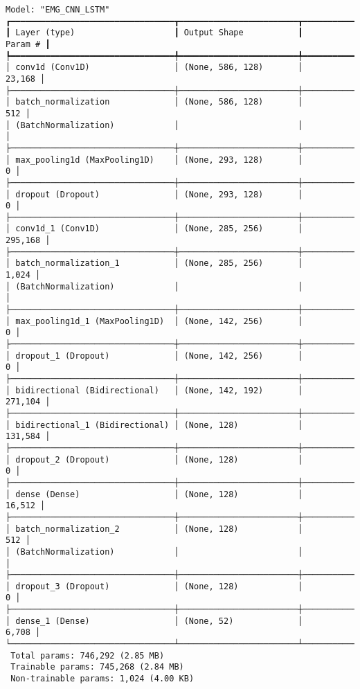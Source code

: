 \begin{verbatim}
Model: "EMG_CNN_LSTM"
┏━━━━━━━━━━━━━━━━━━━━━━━━━━━━━━━━━┳━━━━━━━━━━━━━━━━━━━━━━━━┳━━━━━━━━━━━━━━━┓
┃ Layer (type)                    ┃ Output Shape           ┃       Param # ┃
┡━━━━━━━━━━━━━━━━━━━━━━━━━━━━━━━━━╇━━━━━━━━━━━━━━━━━━━━━━━━╇━━━━━━━━━━━━━━━┩
│ conv1d (Conv1D)                 │ (None, 586, 128)       │        23,168 │
├─────────────────────────────────┼────────────────────────┼───────────────┤
│ batch_normalization             │ (None, 586, 128)       │           512 │
│ (BatchNormalization)            │                        │               │
├─────────────────────────────────┼────────────────────────┼───────────────┤
│ max_pooling1d (MaxPooling1D)    │ (None, 293, 128)       │             0 │
├─────────────────────────────────┼────────────────────────┼───────────────┤
│ dropout (Dropout)               │ (None, 293, 128)       │             0 │
├─────────────────────────────────┼────────────────────────┼───────────────┤
│ conv1d_1 (Conv1D)               │ (None, 285, 256)       │       295,168 │
├─────────────────────────────────┼────────────────────────┼───────────────┤
│ batch_normalization_1           │ (None, 285, 256)       │         1,024 │
│ (BatchNormalization)            │                        │               │
├─────────────────────────────────┼────────────────────────┼───────────────┤
│ max_pooling1d_1 (MaxPooling1D)  │ (None, 142, 256)       │             0 │
├─────────────────────────────────┼────────────────────────┼───────────────┤
│ dropout_1 (Dropout)             │ (None, 142, 256)       │             0 │
├─────────────────────────────────┼────────────────────────┼───────────────┤
│ bidirectional (Bidirectional)   │ (None, 142, 192)       │       271,104 │
├─────────────────────────────────┼────────────────────────┼───────────────┤
│ bidirectional_1 (Bidirectional) │ (None, 128)            │       131,584 │
├─────────────────────────────────┼────────────────────────┼───────────────┤
│ dropout_2 (Dropout)             │ (None, 128)            │             0 │
├─────────────────────────────────┼────────────────────────┼───────────────┤
│ dense (Dense)                   │ (None, 128)            │        16,512 │
├─────────────────────────────────┼────────────────────────┼───────────────┤
│ batch_normalization_2           │ (None, 128)            │           512 │
│ (BatchNormalization)            │                        │               │
├─────────────────────────────────┼────────────────────────┼───────────────┤
│ dropout_3 (Dropout)             │ (None, 128)            │             0 │
├─────────────────────────────────┼────────────────────────┼───────────────┤
│ dense_1 (Dense)                 │ (None, 52)             │         6,708 │
└─────────────────────────────────┴────────────────────────┴───────────────┘
 Total params: 746,292 (2.85 MB)
 Trainable params: 745,268 (2.84 MB)
 Non-trainable params: 1,024 (4.00 KB)

\end{verbatim}
